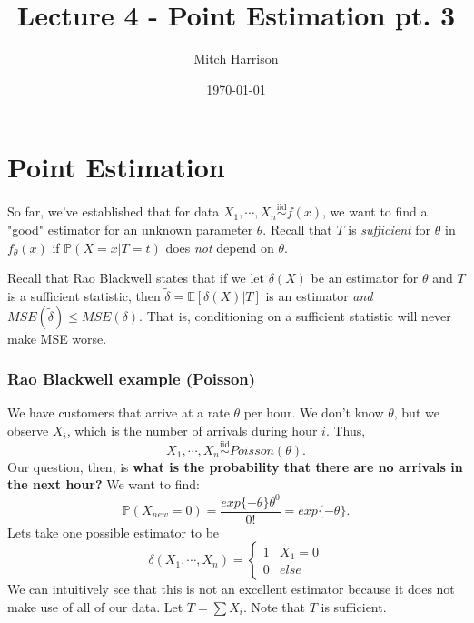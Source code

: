 \documentclass[titlepage, 12pt, leqno]{article}
\title{\Huge{Lecture 4 - Point Estimation pt. 3}}
\author{\large{Mitch Harrison}}
\date{\today}
\begin{document}
\setlength{\parskip}{1\baselineskip}
\setlength{\parindent}{15pt}
\maketitle
\tableofcontents
\newpage


\section{Point Estimation}

So far, we've established that for data $X_{1}, \cdots, X_{n}
\overset{\mathrm{iid}}{\sim}f(x)$, we want to find a "good" estimator for
an unknown parameter $\theta$. Recall that $T$ is \textit{sufficient} for
 $\theta$ in $f_{\theta}(x)$ if $\mathbb{P}(X=x|T=t)$ does \textit{not}
depend on $\theta$.

Recall that Rao Blackwell states that if we let $\delta(X)$ be an estimator
for $\theta$ and $T$ is a sufficient statistic, then $\tilde{\delta}= 
\mathbb{E}[\delta(X)|T]$ is an estimator \textit{and} $MSE(\tilde{\delta}) \le
MSE(\delta)$. That is, conditioning on a sufficient statistic will never make
MSE worse.

\subsubsection{Rao Blackwell example (Poisson)}
We have customers that arrive at a rate $\theta$ per hour. We don't know
 $\theta$, but we observe $X_{i}$, which is the number of arrivals during hour
 $i$. Thus, 
 \[
 X_{1}, \cdots , X_{n} \overset{\mathrm{iid}}{\sim}Poisson(\theta).
 \]
Our question, then, is \textbf{what is the probability that there are
no arrivals in the next hour?} We want to find:
\[
    \mathbb{P}(X_{new} = 0) = \frac{exp\{-\theta\}\theta^{0}}{0!} =
    exp\{-\theta\}.
\]
Lets take one possible estimator to be
\[
\delta(X_{1}, \cdots ,X_{n}) = 
\begin{cases}
    1 & X_{1} = 0 \\
    0 & else
\end{cases}
\]
We can intuitively see that this is not an excellent estimator because it 
does not make use of all of our data. Let $T = \sum X_{i}$. Note that $T$ is
sufficient.
\end{document}
